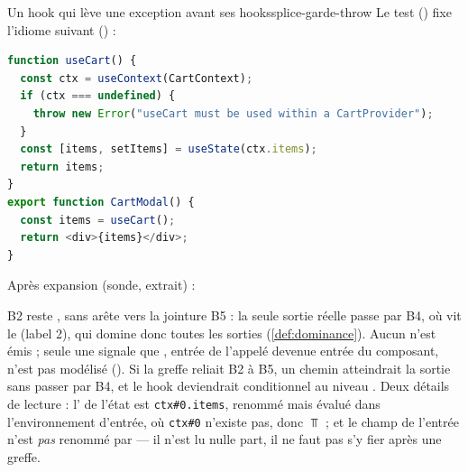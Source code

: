 \begin{exemple}{Un hook qui lève une exception avant ses hooks}{splice-garde-throw}
Le test  () fixe l'idiome suivant () :
\begin{lstlisting}[language=TypeScript]
function useCart() {
  const ctx = useContext(CartContext);
  if (ctx === undefined) {
    throw new Error("useCart must be used within a CartProvider");
  }
  const [items, setItems] = useState(ctx.items);
  return items;
}
export function CartModal() {
  const items = useCart();
  return <div>{items}</div>;
}
\end{lstlisting}
Après expansion (sonde, extrait) :
B2 reste , sans arête vers la jointure B5 : la seule sortie réelle passe par B4, où vit le  (label 2), qui domine donc toutes les sorties (\cref{def:dominance}). Aucun  n'est émis ; seule une \Info{}  signale que , entrée  de l'appelé devenue entrée du composant, n'est pas modélisé (). Si la greffe reliait B2 à B5, un chemin atteindrait la sortie sans passer par B4, et le hook deviendrait conditionnel au niveau \Error{}. Deux détails de lecture : l' de l'état est \texttt{ctx\#0.items}, renommé mais évalué dans l'environnement d'entrée, où \texttt{ctx\#0} n'existe pas, donc $\Top$ ; et le champ  de l'entrée  n'est \emph{pas} renommé par  --- il n'est lu nulle part, il ne faut pas s'y fier après une greffe.
\end{exemple}

